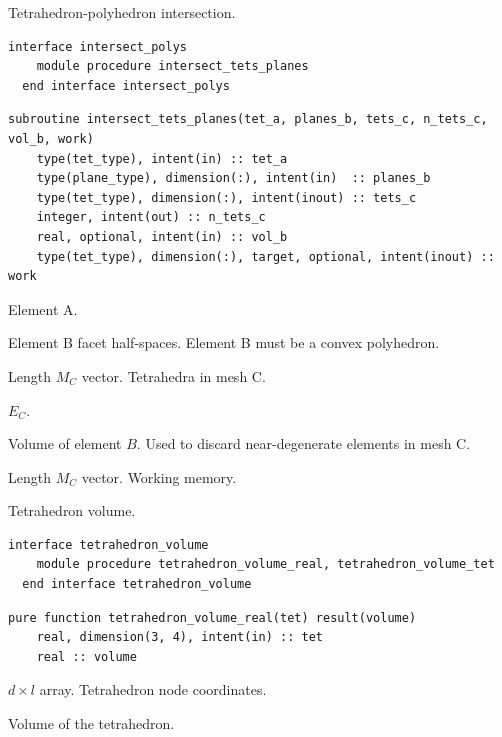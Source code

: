 \documentclass{article}
\begin{document}
\noindent Tetrahedron-polyhedron intersection.

\begin{lstlisting}[language=FORTRAN]
  interface intersect_polys
    module procedure intersect_tets_planes
  end interface intersect_polys
\end{lstlisting}
  
\begin{lstlisting}[language=FORTRAN]
  subroutine intersect_tets_planes(tet_a, planes_b, tets_c, n_tets_c, vol_b, work)
    type(tet_type), intent(in) :: tet_a
    type(plane_type), dimension(:), intent(in)  :: planes_b
    type(tet_type), dimension(:), intent(inout) :: tets_c
    integer, intent(out) :: n_tets_c
    real, optional, intent(in) :: vol_b
    type(tet_type), dimension(:), target, optional, intent(inout) :: work
\end{lstlisting}

\begin{description}[font=\ttfamily\bfseries,leftmargin=2.2\parindent,labelindent=1.7\parindent,noitemsep]
  \item[tet\_a] Element A.
  \item[planes\_b] Element B facet half-spaces. Element B must be a convex
    polyhedron.
  \item[tets\_c] Length $M_C$ vector. Tetrahedra in mesh C.
  \item[n\_tets\_c] $E_C$.
  \item[vol\_b] Volume of element $B$. Used to discard near-degenerate elements
    in mesh C.
  \item[work] Length $M_C$ vector. Working memory.
\end{description}

\noindent Tetrahedron volume.

\begin{lstlisting}[language=FORTRAN]
  interface tetrahedron_volume
    module procedure tetrahedron_volume_real, tetrahedron_volume_tet
  end interface tetrahedron_volume
\end{lstlisting}

\begin{lstlisting}[language=FORTRAN]
  pure function tetrahedron_volume_real(tet) result(volume)
    real, dimension(3, 4), intent(in) :: tet
    real :: volume
\end{lstlisting}

\begin{description}[font=\ttfamily\bfseries,leftmargin=2.2\parindent,labelindent=1.7\parindent,noitemsep]
  \item[tet] $d \times l$ array. Tetrahedron node coordinates.
  \item[volume] Volume of the tetrahedron.
\end{description}
\end{document}
